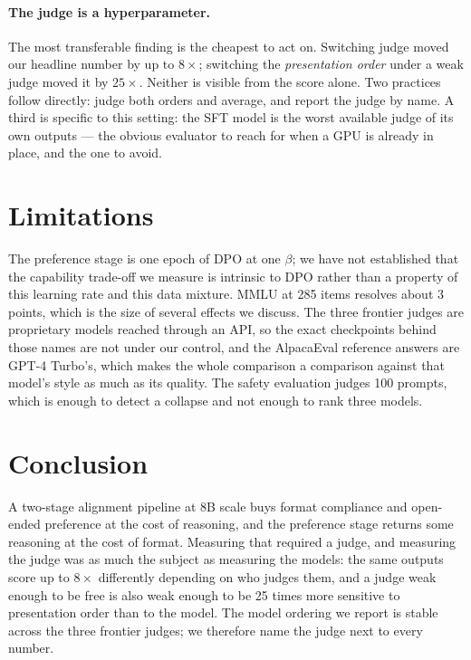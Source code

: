 \documentclass{article}
\begin{document}
\paragraph{The judge is a hyperparameter.} The most transferable finding is the
cheapest to act on. Switching judge moved our headline number by up to $8\times$;
switching the \emph{presentation order} under a weak judge moved it by $25\times$.
Neither is visible from the score alone. Two practices follow directly: judge both
orders and average, and report the judge by name. A third is specific to this
setting: the SFT model is the worst available judge of its own outputs --- the
obvious evaluator to reach for when a GPU is already in place, and the one to
avoid.

\section{Limitations}
\label{sec:limitations}
The preference stage is one epoch of DPO at one
$\beta$; we have not established that the capability trade-off we measure is
intrinsic to DPO rather than a property of this learning rate and this data
mixture. MMLU at 285 items resolves about 3 points, which is the size of several
effects we discuss. The three frontier judges are proprietary models reached through an
API, so the exact checkpoints behind those names are not under our control, and
the AlpacaEval reference answers are GPT-4 Turbo's, which makes the whole
comparison a comparison against that model's style as much as its quality. The
safety evaluation judges 100 prompts, which is enough to detect a collapse and
not enough to rank three models.

\section{Conclusion}



A two-stage alignment pipeline at 8B scale buys format compliance and open-ended
preference at the cost of reasoning, and the preference stage returns some
reasoning at the cost of format. Measuring that required a judge, and measuring
the judge was as much the subject as measuring the models: the same outputs score
up to $8\times$
differently depending on who judges them, and a judge weak enough to be free is
also weak enough to be 25 times more sensitive to presentation order than to the
model. The model ordering we report is stable across the three frontier judges;
we therefore name the judge next to every number.
\end{document}
